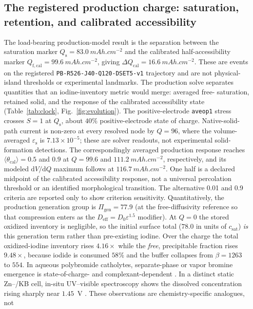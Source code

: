 \documentclass[11pt]{article}
\newcommand{\csat}{c_{\mathrm{sat}}}
\newcommand{\epss}{\varepsilon_{\mathrm{s}}}
\newcommand{\epsl}{\varepsilon}
\newcommand{\Deff}{D_{\mathrm{eff}}}
\newcommand{\thetacal}{\theta_{\mathrm{cal}}}
\newcommand{\Qfcal}{Q_{\mathrm{f,cal}}}
\begin{document}
\subsection{The registered production charge: saturation, retention, and calibrated accessibility}
\label{sec:res-clock}
The load-bearing production-model result is the separation between the saturation marker
$Q_{\mathrm s}=\SI{83.0}{mAh.cm^{-2}}$ and the calibrated half-accessibility marker
$\Qfcal=\SI{99.6}{mAh.cm^{-2}}$, giving
$\Delta Q_{\mathrm{cal}}=\SI{16.6}{mAh.cm^{-2}}$. These are events on the registered
\texttt{PB-R526-J40-Q120-DSET5-v1} trajectory and are not physical-island thresholds or experimental
landmarks. The production solve separates quantities that an iodine-inventory metric would merge: averaged
free- saturation, retained solid, and the response of the calibrated accessibility state
(Table~\ref{tab:clock}, Fig.~\ref{fig:evolution}). The positive-electrode \texttt{aveop1} stress crosses $S=1$ at
$Q_{\mathrm s}$, about $40\%$ positive-electrode state of charge. Native-solid-path current is non-zero at every
resolved node by $Q=96$, where the volume-averaged $\epss$ is $7.13\times10^{-5}$; these are solver readouts,
not experimental solid-formation detections. The correspondingly averaged production response reaches
$\langle\thetacal\rangle=0.5$ and $0.9$ at $Q=99.6$ and $\SI{111.2}{mAh.cm^{-2}}$, respectively, and its
modeled $\mathrm{d}V/\mathrm{d}Q$ maximum follows at $\SI{116.7}{mAh.cm^{-2}}$. One half is a declared
midpoint of the calibrated accessibility response, not a universal percolation threshold or an identified
morphological transition. The alternative 0.01 and 0.9 criteria are reported only to show criterion
sensitivity.
Quantitatively, the production generation group is $\Pi_{\mathrm{gen}}=77.9$ (at the free-diffusivity reference
so that compression enters as the $\Deff=D_0\epsl^{1.5}$ modifier). At $Q=0$ the stored oxidized inventory is
negligible, so the initial surface total ($78.0$ in units of $\csat$) \emph{is} this generation term rather
than pre-existing iodine. Over the charge the total oxidized-iodine inventory rises $4.16\times$
while the \emph{free}, precipitable fraction rises $9.48\times$, because iodide is consumed $58\%$ and the
buffer collapses from $\beta=1263$ to $554$. In aqueous polybromide catholytes, separate-phase or vapor
bromine emergence is state-of-charge- and complexant-dependent \citep{Choi2024}. In a distinct static
Zn--/KB cell, in-situ UV--visible spectroscopy shows the dissolved  concentration rising
sharply near $1.45$~V \citep{ChenACSEnergyLett2024}. These observations are chemistry-specific analogues, not
\end{document}
